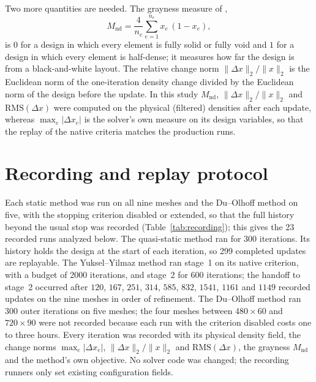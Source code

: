 \documentclass[11pt,a4paper]{article}
\newcommand{\Mnd}{M_{\mathrm{nd}}}
\newcommand{\dx}{\Delta x}
\newcommand{\maxdx}{\max_e|\Delta x_e|}
\newcommand{\relL}{\|\Delta x\|_2/\|x\|_2}
\newcommand{\RMS}{\mathrm{RMS}}
\begin{document}
Two more quantities are needed. The grayness measure of \citet{Sigmund2007},
\begin{equation}
\label{eq:Mnd}
\Mnd = \frac{4}{n_e}\sum_{e=1}^{n_e} x_e\,(1 - x_e),
\end{equation}
is $0$ for a design in which every element is fully solid or fully void and $1$ for a design in which every element is half-dense; it measures how far the design is from a black-and-white layout. The relative change norm $\relL$ is the Euclidean norm of the one-iteration density change divided by the Euclidean norm of the design before the update. In this study $\Mnd$, $\relL$ and $\RMS(\dx)$ were computed on the physical (filtered) densities after each update, whereas $\maxdx$ is the solver's own measure on its design variables, so that the replay of the native criteria matches the production runs.

\section{Recording and replay protocol}
\label{sec:protocol}

Each static method was run on all nine meshes and the Du--Olhoff method on five, with the stopping criterion disabled or extended, so that the full history beyond the usual stop was recorded (Table~\ref{tab:recording}); this gives the 23 recorded runs analyzed below. The quasi-static method ran for 300 iterations. Its history holds the design at the start of each iteration, so 299 completed updates are replayable. The Yuksel--Yilmaz method ran stage~1 on its native criterion, with a budget of 2000 iterations, and stage~2 for 600 iterations; the handoff to stage~2 occurred after $120$, $167$, $251$, $314$, $585$, $832$, $1541$, $1161$ and $1149$ recorded updates on the nine meshes in order of refinement. The Du--Olhoff method ran 300 outer iterations on five meshes; the four meshes between $480\times60$ and $720\times90$ were not recorded because each run with the criterion disabled costs one to three hours. Every iteration was recorded with its physical density field, the change norms $\maxdx$, $\relL$ and $\RMS(\dx)$, the grayness $\Mnd$ and the method's own objective. No solver code was changed; the recording runners only set existing configuration fields.
\end{document}
